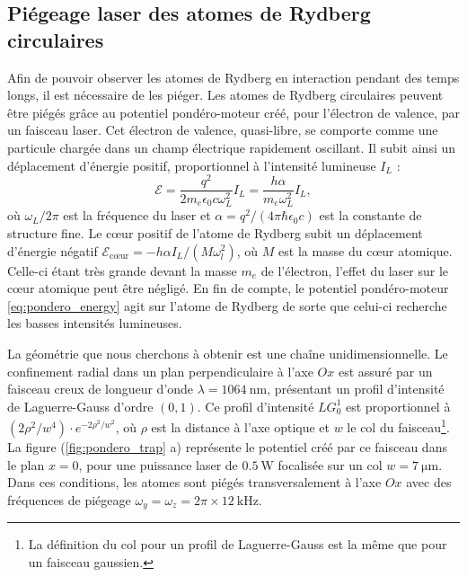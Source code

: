 	\subsection{Piégeage laser des atomes de Rydberg circulaires}\label{subsec:circ_laser_trapping}
\noindent Afin de pouvoir observer les atomes de Rydberg en interaction pendant des temps longs, il est nécessaire de les piéger.
Les atomes de Rydberg circulaires peuvent être piégés grâce au potentiel pondéro-moteur créé, pour l'électron de valence, par un faisceau laser.
Cet électron de valence, quasi-libre, se comporte comme une particule chargée dans un champ électrique rapidement oscillant.
Il subit ainsi un déplacement d'énergie positif, proportionnel à l'intensité lumineuse $I_L$ \cite{MX_FABRERYDHF76} :
\begin{equation}
\label{eq:pondero_energy}
\mathcal{E} = \frac{q^2}{2m_e \epsilon_0 c \omega_L^2} I_L
= \frac{h\alpha}{m_e\omega_L^2}I_L,
\end{equation}
où $\omega_L/2\pi$ est la fréquence du laser et $\alpha = q^2/(4\pi\hbar\epsilon_0 c)$ est la constante de structure fine.
Le c\oe ur positif de l'atome de Rydberg subit un déplacement d'énergie négatif $\mathcal{E}_{\text{c\oe ur}} = - h\alpha I_L/(M\omega_l^2)$, où $M$ est la masse du c\oe ur atomique.
Celle-ci étant très grande devant la masse $m_e$ de l'électron, l'effet du laser sur le c\oe ur atomique peut être négligé.
En fin de compte, le potentiel pondéro-moteur \eqref{eq:pondero_energy} agit sur l'atome de Rydberg de sorte que celui-ci recherche les basses intensités lumineuses.

La géométrie que nous cherchons à obtenir est une chaîne unidimensionnelle.
Le confinement radial dans un plan perpendiculaire à l'axe $Ox$ est assuré par un faisceau \og creux \fg{} de longueur d'onde $\lambda=\SI{1064}{\nano\meter}$, présentant un profil d'intensité de Laguerre-Gauss d'ordre $(0,1)$.
Ce profil d'intensité $LG_0^1$ est proportionnel à $(2\rho^2/w^4)\cdot e^{-2\rho^2/w^2}$, où $\rho$ est la distance à l'axe optique et $w$ le col du faisceau\footnote{
La définition du col pour un profil de Laguerre-Gauss 
est la même que pour un faisceau gaussien.
}.
La figure (\ref{fig:pondero_trap} a) représente le potentiel créé par ce faisceau dans le plan $x=0$, pour une puissance laser de $\SI{0.5}{\watt}$ focalisée sur un col $w=\SI{7}{\um}$.
Dans ces conditions, les atomes sont piégés transversalement à l'axe $Ox$ avec des fréquences de piégeage $\omega_y=\omega_z= 2\pi\times \SI{12}{\kHz}$.

